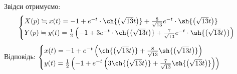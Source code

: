 \documentclass[12 pt]{article}
\begin{document}
Звідси отримуємо: 
$$\begin{cases}
    X(p)\fallingdotseq x(t) =
 -1 + e^{-t} \cdot \ch{\left(\sqrt{13} t\right)} + \frac{8}{ \sqrt{13}} 
 e^{-t} \cdot \sh{\left(\sqrt{13}t \right)} \\ 
 Y(p) \fallingdotseq y(t) = \frac{1}{2} \left( 
     -1 + 3e^{-t} \cdot \ch{\left(\sqrt{13} t\right)} 
     + \frac{7}{ \sqrt{13} }e^{-t} \cdot \sh{\left(\sqrt{13}t \right)}
 \right)
\end{cases}
$$
Відповідь: $
\begin{cases}
    x(t) =
 -1 + e^{-t}\left( \ch{\left(\sqrt{13} t\right)} + \frac{8}{ \sqrt{13}} 
 \sh{\left(\sqrt{13}t \right)}\right) \\ 
 y(t) = \frac{1}{2} \left( 
     -1 + e^{-t} \left(3\ch{\left(\sqrt{13} t\right)} 
     + \frac{7}{ \sqrt{13} }\sh{\left(\sqrt{13}t \right)}
 \right)\right)
\end{cases}
$ 
\end{document}
